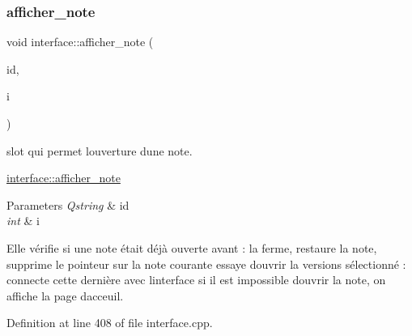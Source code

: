 \subsubsection{\texorpdfstring{afficher\+\_\+note}{afficher\_note}}
{\footnotesize\ttfamily void interface\+::afficher\+\_\+note (\begin{DoxyParamCaption}\item[{Q\+String}]{id,  }\item[{int}]{i }\end{DoxyParamCaption})\hspace{0.3cm}{\ttfamily [slot]}}



slot qui permet l\textquotesingle{}ouverture d\textquotesingle{}une note. 

\hyperlink{classinterface_a320051a7a36aa24f53b12df82649f15f}{interface\+::afficher\+\_\+note} 
\begin{DoxyParams}{Parameters}
{\em Qstring} & id \\
\hline
{\em int} & i\\
\hline
\end{DoxyParams}
Elle vérifie si une note était déjà ouverte avant \+: la ferme, restaure la note, supprime le pointeur sur la note courante essaye d\textquotesingle{}ouvrir la versions sélectionné \+: connecte cette dernière avec l\textquotesingle{}interface si il est impossible d\textquotesingle{}ouvrir la note, on affiche la page d\textquotesingle{}acceuil. 

Definition at line 408 of file interface.\+cpp.

